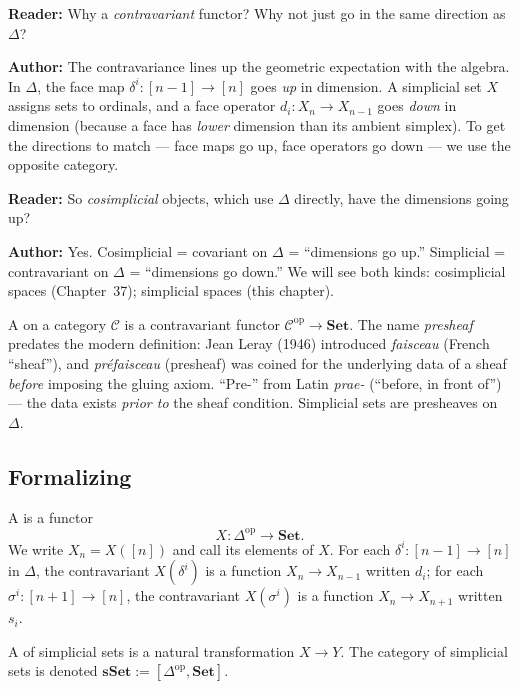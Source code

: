 \begin{dialog}
\textbf{Reader:} Why a \emph{contravariant} functor? Why not just go in
the same direction as $\Delta$?

\textbf{Author:} The contravariance lines up the geometric expectation
with the algebra. In $\Delta$, the face map $\delta^i : [n-1] \to [n]$
goes \emph{up} in dimension. A simplicial set $X$ assigns sets to
ordinals, and a face operator $d_i : X_n \to X_{n-1}$ goes \emph{down}
in dimension (because a face has \emph{lower} dimension than its
ambient simplex). To get the directions to match — face maps go up,
face operators go down — we use the opposite category.

\textbf{Reader:} So \emph{cosimplicial} objects, which use $\Delta$
directly, have the dimensions going up?

\textbf{Author:} Yes. Cosimplicial = covariant on $\Delta$ = ``dimensions
go up.'' Simplicial = contravariant on $\Delta$ = ``dimensions go down.''
We will see both kinds: cosimplicial spaces (Chapter~37); simplicial
spaces (this chapter).
\end{dialog}

\begin{nameorigin}
A  on a category $\mathcal{C}$ is a contravariant functor
$\mathcal{C}^{\mathrm{op}} \to \mathbf{Set}$. The name \emph{presheaf}
predates the modern definition: Jean Leray (1946) introduced
\emph{faisceau} (French ``sheaf''), and \emph{préfaisceau} (presheaf)
was coined for the underlying data of a sheaf \emph{before} imposing
the gluing axiom. ``Pre-'' from Latin \emph{prae-} (``before, in front
of'') — the data exists \emph{prior to} the sheaf condition. Simplicial
sets are presheaves on $\Delta$.
\end{nameorigin}

\subsection{Formalizing}

\begin{definition}
\label{def:simplicial-set}
A  is a functor
\begin{equation*}
  X : \Delta^{\mathrm{op}} \to \mathbf{Set}.
\end{equation*}
We write $X_n = X([n])$ and call its elements  of $X$.
For each $\delta^i : [n-1] \to [n]$ in $\Delta$, the contravariant
$X(\delta^i)$ is a function $X_n \to X_{n-1}$ written $d_i$; for each
$\sigma^i : [n+1] \to [n]$, the contravariant $X(\sigma^i)$ is a function
$X_n \to X_{n+1}$ written $s_i$.

A  of simplicial sets is a natural transformation
$X \to Y$. The category of simplicial sets is denoted $\mathbf{sSet} :=
[\Delta^{\mathrm{op}}, \mathbf{Set}]$.
\end{definition}

